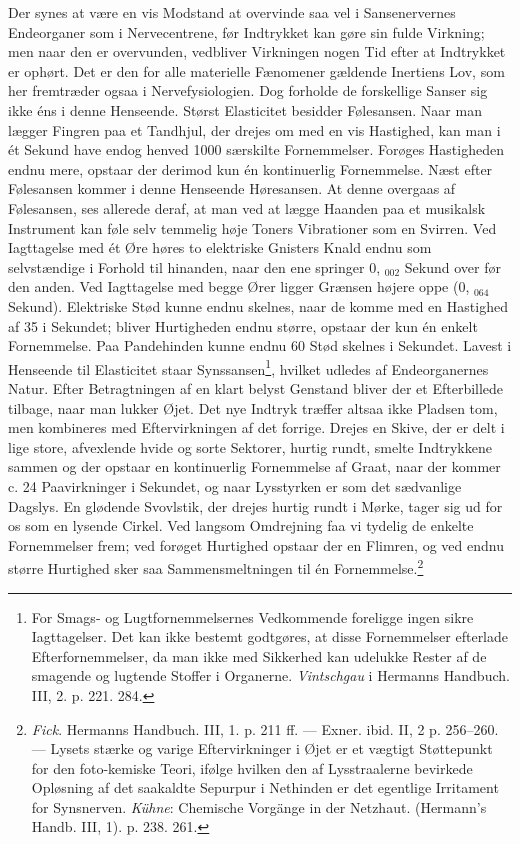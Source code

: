 \documentclass[12pt,a4paper,openany]{book}
\newcommand{\opage}[1]{\marginnote{\footnotesize\textit{[#1]}}}
\begin{document}
Der synes at være en vis Modstand at overvinde saa vel i Sansenervernes
Endeorganer som i Nervecentrene, før Indtrykket kan gøre sin fulde
Virkning; men naar den er overvunden, vedbliver Virkningen nogen Tid
efter at Indtrykket er ophørt. Det er den for alle materielle Fænomener
gældende Inertiens Lov, som her fremtræder ogsaa i Nervefysiologien. Dog
forholde de forskellige Sanser sig ikke éns i denne Henseende. Størst
Elasticitet besidder Følesansen. Naar man lægger Fingren paa et
Tandhjul, der drejes om med en vis Hastighed, kan man i ét Sekund have
endog henved 1000 særskilte Fornemmelser. Forøges Hastigheden endnu
mere, opstaar der derimod kun én kontinuerlig Fornemmelse. Næst efter
Følesansen kommer i denne Henseende Høresansen. At denne overgaas af
Følesansen, ses allerede deraf, at man ved at lægge Haanden paa et
musikalsk Instrument kan føle selv temmelig høje Toners Vibrationer som
en Svirren. Ved Iagttagelse med ét Øre høres to elektriske Gnisters
Knald endnu som selvstændige i Forhold til hinanden, naar den ene
springer 0, $_{002}$ Sekund over før den anden. Ved Iagttagelse med
begge Ører ligger Grænsen højere oppe (0, $_{064}$ Sekund). Elektriske
Stød kunne endnu skelnes, naar de komme med en Hastighed af 35 i
Sekundet; bliver Hurtigheden endnu større, opstaar der kun én enkelt
Fornemmelse. Paa Pandehinden kunne endnu 60 Stød skelnes i Sekundet.
Lavest i Henseende til Elasticitet staar Synssansen\footnote[1]{For
Smags- og Lugtfornemmelsernes Vedkommende foreligge ingen sikre
Iagttagelser. Det kan ikke bestemt godtgøres, at disse Fornemmelser
efterlade Efterfornemmelser, da man ikke med Sikkerhed kan udelukke
Rester af de smagende og lugtende Stoffer i Organerne. \emph{Vintschgau}
i Hermanns Handbuch. III, 2. p. 221. 284.}, hvilket udledes af
Endeorganernes Natur. Efter Betragtningen af en klart belyst Genstand
\opage{129}bliver der et Efterbillede tilbage, naar man lukker Øjet. Det
nye Indtryk træffer altsaa ikke Pladsen tom, men kombineres med
Eftervirkningen af det forrige. Drejes en Skive, der er delt i lige
store, afvexlende hvide og sorte Sektorer, hurtig rundt, smelte
Indtrykkene sammen og der opstaar en kontinuerlig Fornemmelse af Graat,
naar der kommer c. 24 Paavirkninger i Sekundet, og naar Lysstyrken er
som det sædvanlige Dagslys. En glødende Svovlstik, der drejes hurtig
rundt i Mørke, tager sig ud for os som en lysende Cirkel. Ved langsom
Omdrejning faa vi tydelig de enkelte Fornemmelser frem; ved forøget
Hurtighed opstaar der en Flimren, og ved endnu større Hurtighed sker saa
Sammensmeltningen til én Fornemmelse.\footnote[1]{\emph{Fick}. Hermanns
Handbuch. III, 1. p. 211 ff. --- Exner. ibid. II, 2 p. 256--260. ---
Lysets stærke og varige Eftervirkninger i Øjet er et vægtigt Støttepunkt
for den foto-kemiske Teori, ifølge hvilken den af Lysstraalerne
bevirkede Opløsning af det saakaldte Sepurpur i Nethinden er det
egentlige Irritament for Synsnerven. \emph{Kühne}: Chemische Vorgänge in
der Netzhaut. (Hermann’s Handb. III, 1). p. 238. 261.}
\end{document}
